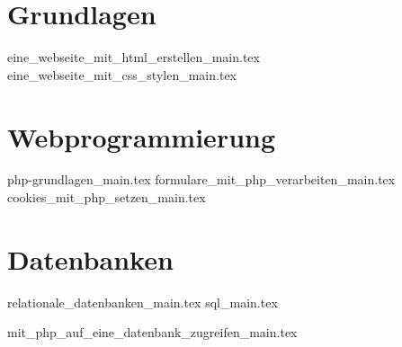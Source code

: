
\part{Grundlagen}

{eine_webseite_mit_html_erstellen_main.tex}
{eine_webseite_mit_css_stylen_main.tex}

\part{Webprogrammierung}

{php-grundlagen_main.tex}
{formulare_mit_php_verarbeiten_main.tex}
{cookies_mit_php_setzen_main.tex}

\part{Datenbanken}

{relationale_datenbanken_main.tex}
{sql_main.tex}

{mit_php_auf_eine_datenbank_zugreifen_main.tex}